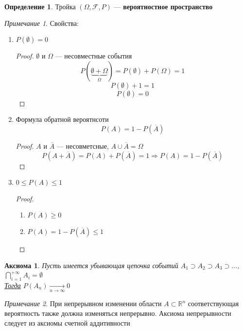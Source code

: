 \documentclass[oneside]{book}
\newcommand{\R}{\mathbb{R}}
\theoremstyle{plain}
\newtheorem{axiom}{Аксиома}
\theoremstyle{remark}
\newtheorem*{remark}{Примечание}
\theoremstyle{definition}
\newtheorem*{definition}{Определение}
\begin{document}
\begin{definition}
Тройка \((\Omega, \mathcal{F}, P)\) --- \textbf{вероятностное пространство}
\end{definition}
\begin{remark}
Свойства:
\begin{enumerate}
\item \(P(\emptyset) = 0\)
\begin{proof}
\(\emptyset\) и \(\Omega\) --- несовместные события
\[ P(\underbrace{\emptyset + \Omega}_\Omega) = P(\emptyset) + P(\Omega) = 1 \]
\[ P(\emptyset) + 1 = 1 \]
\[ P(\emptyset) = 0 \]
\end{proof}
\item Формула обратной вероятнсоти \[ P(A) = 1 - P(\overline{A}) \]
\begin{proof}
\(A\) и \(\overline{A}\) --- несовметсные, \(A \cup \overline{A} = \Omega\)
\[ P(A + \overline{A}) = P(A) + P(\overline{A}) = 1 \Rightarrow P(A) = 1 - P(\overline{A}) \]
\end{proof}
\item \(0 \le P(A) \le 1\)
\begin{proof}
\-
\begin{enumerate}
\item \(P(A) \ge 0\)
\item \(P(A) = 1 - P(\overline{A}) \le 1\)
\end{enumerate}
\end{proof}
\end{enumerate}
\end{remark}
\begin{axiom}
Пусть имеется убывающая цепочка событий \(A_1 \supset A_2 \supset A_3 \supset \dots\), \(\bigcap_{i = 1}^{+ \infty} A_i = \emptyset\) \\
\uline{Тогда} \(P(A_n) \xrightarrow[n \to \infty]{} 0\)
\end{axiom}
\begin{remark}
При непрерывном изменении области \(A\subset \R^n\) соответствующая вероятность также должна изменяться непрерывно.
Аксиома непрерывности следует из аксиомы счетной аддитивности
\end{remark}
\end{document}
